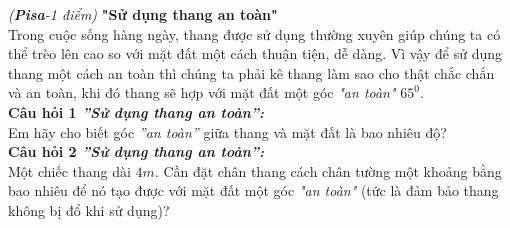\begin{ex}%
\textit{(\textbf{Pisa}-1 điểm)} \textbf{"Sử dụng thang an toàn"} \\
Trong cuộc sống hàng ngày, thang được sử dụng thường xuyên giúp chúng ta có thể trèo lên cao so với mặt đất một cách thuận tiện, dễ dàng. Vì vậy để sử dụng thang một cách an toàn thì chúng ta phải kê thang làm sao cho thật chắc chắn và an toàn, khi đó thang sẽ hợp với mặt đất một góc \textit{"an toàn"} $65^0$. \\
\textbf{Câu hỏi 1 \textit{''Sử dụng thang an toàn'':}} \\
Em hãy cho biết góc \textit{''an toàn''} giữa thang và mặt đất là bao nhiêu độ? \\
\textbf{Câu hỏi 2 \textit{''Sử dụng thang an toàn'':}} \\
Một chiếc thang dài $4m$. Cần đặt chân thang cách chân tường một khoảng bằng bao nhiêu để nó tạo được với mặt đất một góc \textit{"an toàn"} (tức là đảm bảo thang không bị đổ khi sử dụng)?
\end{ex}
